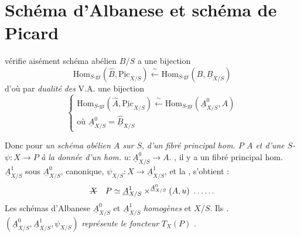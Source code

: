 \documentclass[11pt,a4paper]{article}
\begin{document}
\section{Schéma d'Albanese et schéma de Picard}

\ill{} vérifie aisément   schéma abélien $B/S$ \ill{} a une bijection
\[
\mathrm{Hom}_{S\text{-gr}}(\hat{B}, \underline{\mathrm{Pic}}_{X/S}) \xleftarrow{\ \sim\ } \mathrm{Hom}_{S\text{-gr}}(B, \underline{B}_{X/S})
\]
d'où par \emph{dualité} \emph{des} V.A. une bijection
\[
\begin{cases}
\mathrm{Hom}_{S\text{-gr}}(\hat{A}, \underline{\mathrm{Pic}}_{X/S}) \xleftarrow{\ \sim\ } \mathrm{Hom}_{S\text{-gr}}(\underline{A}^{0}_{X/S}, A) \\[4pt]
\text{où } \underline{A}^{0}_{X/S} = \hat{\underline{B}}_{X/S}
\end{cases}
\]

Donc pour \emph{un schéma abélien $A$ sur $S$}, \emph{} \emph{d'un fibré principal hom. $P$  $A$ et d'une $S$- $\psi\colon X \to P$} \emph{ \ill{}} \emph{à}  \emph{la donnée d'un hom.} $u\colon \underline{A}^{0}_{X/S} \to A$. \ill{} \ill{} , il y a un fibré principal hom.  \struck{\ill{}} $\underline{A}^{1}_{X/S}$ sous $\underline{A}^{0}_{X/S}$, canonique, $\psi_{X/S}\colon X \to \underline{A}^{1}_{X/S}$, et la    \ill{}, s'obtient   :
\[
\text{\struck{$X$}}\quad P \simeq \underline{A}^{1}_{X/S} \times^{\underline{A}^{0}_{X/S}} (A, u)\ \ldots\ldots
\]
 Les schémas d'Albanese $\underline{A}^{0}_{X/S}$ et $\underline{A}^{1}_{X/S}$  \emph{homogènes} et \emph{}  $X/S$. Ils      . \emph{  } $(\underline{A}^{0}_{X/S}, \underline{A}^{1}_{X/S}, \psi_{X/S})$ \emph{représente le foncteur} $T_X(P)$  .
\end{document}
